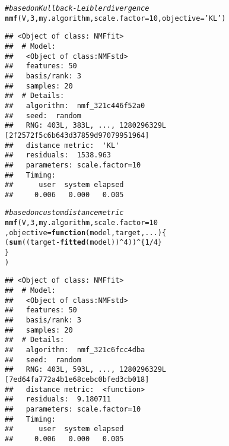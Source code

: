 \documentclass[a4paper]{article}\usepackage[]{graphicx}\usepackage[]{color}
\makeatletter
\newcommand{\hlnum}[1]{\textcolor[rgb]{0.686,0.059,0.569}{#1}}%
\newcommand{\hlstr}[1]{\textcolor[rgb]{0.192,0.494,0.8}{#1}}%
\newcommand{\hlcom}[1]{\textcolor[rgb]{0.678,0.584,0.686}{\textit{#1}}}%
\newcommand{\hlopt}[1]{\textcolor[rgb]{0,0,0}{#1}}%
\newcommand{\hlstd}[1]{\textcolor[rgb]{0.345,0.345,0.345}{#1}}%
\newcommand{\hlkwa}[1]{\textcolor[rgb]{0.161,0.373,0.58}{\textbf{#1}}}%
\newcommand{\hlkwc}[1]{\textcolor[rgb]{0.333,0.667,0.333}{#1}}%
\newcommand{\hlkwd}[1]{\textcolor[rgb]{0.737,0.353,0.396}{\textbf{#1}}}%
\newenvironment{kframe}{%
 \def\at@end@of@kframe{}%
 \ifinner\ifhmode%
  \def\at@end@of@kframe{\end{minipage}}%
  \begin{minipage}{\columnwidth}%
 \fi\fi%
 \def\FrameCommand##1{\hskip\@totalleftmargin \hskip-\fboxsep
 \colorbox{shadecolor}{##1}\hskip-\fboxsep
     \hskip-\linewidth \hskip-\@totalleftmargin \hskip\columnwidth}%
 \MakeFramed {\advance\hsize-\width
   \@totalleftmargin\z@ \linewidth\hsize
   \@setminipage}}%
 {\par\unskip\endMakeFramed%
 \at@end@of@kframe}
\newenvironment{knitrout}{}{} %
\makeatother
\begin{document}
\begin{knitrout}
\color{fgcolor}\begin{kframe}
\begin{alltt}
\hlcom{# based on Kullback-Leibler divergence}
\hlkwd{nmf}\hlstd{(V,} \hlnum{3}\hlstd{, my.algorithm,} \hlkwc{scale.factor}\hlstd{=}\hlnum{10}\hlstd{,} \hlkwc{objective}\hlstd{=}\hlstr{'KL'}\hlstd{)}
\end{alltt}
\begin{verbatim}
## <Object of class: NMFfit>
##  # Model:
##   <Object of class:NMFstd>
##   features: 50 
##   basis/rank: 3 
##   samples: 20 
##  # Details:
##   algorithm:  nmf_321c446f52a0 
##   seed:  random 
##   RNG: 403L, 383L, ..., 1280296329L [2f2572f5c6b643d37859d97079951964]
##   distance metric:  'KL' 
##   residuals:  1538.963 
##   parameters: scale.factor=10 
##   Timing:
##      user  system elapsed 
##     0.006   0.000   0.005
\end{verbatim}
\begin{alltt}
\hlcom{# based on custom distance metric}
\hlkwd{nmf}\hlstd{(V,} \hlnum{3}\hlstd{, my.algorithm,} \hlkwc{scale.factor}\hlstd{=}\hlnum{10}
        \hlstd{,} \hlkwc{objective}\hlstd{=}\hlkwa{function}\hlstd{(}\hlkwc{model}\hlstd{,} \hlkwc{target}\hlstd{,} \hlkwc{...}\hlstd{)\{}
            \hlstd{(} \hlkwd{sum}\hlstd{( (target}\hlopt{-}\hlkwd{fitted}\hlstd{(model))}\hlopt{^}\hlnum{4} \hlstd{) )}\hlopt{^}\hlstd{\{}\hlnum{1}\hlopt{/}\hlnum{4}\hlstd{\}}
                \hlstd{\}}
\hlstd{)}
\end{alltt}
\begin{verbatim}
## <Object of class: NMFfit>
##  # Model:
##   <Object of class:NMFstd>
##   features: 50 
##   basis/rank: 3 
##   samples: 20 
##  # Details:
##   algorithm:  nmf_321c6fcc4dba 
##   seed:  random 
##   RNG: 403L, 593L, ..., 1280296329L [7ed64fa772a4b1e68cebc0bfed3cb018]
##   distance metric:  <function> 
##   residuals:  9.180711 
##   parameters: scale.factor=10 
##   Timing:
##      user  system elapsed 
##     0.006   0.000   0.005
\end{verbatim}
\end{kframe}
\end{knitrout}

%
%
\end{document}
